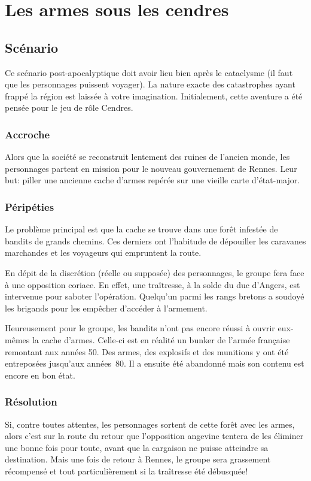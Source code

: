 \chapter{Les armes sous les cendres}

\section{Scénario}

Ce scénario post-apocalyptique doit avoir lieu bien après le cataclysme (il faut que les personnages puissent voyager).
La nature exacte des catastrophes ayant frappé la région est laissée à votre imagination.
Initialement, cette aventure a été pensée pour le jeu de rôle Cendres.

\subsection{Accroche}

Alors que la société se reconstruit lentement des ruines de l'ancien monde, les personnages partent en mission pour le nouveau gouvernement de Rennes.
Leur but: piller une ancienne cache d'armes repérée sur une vieille carte d'état-major.

\subsection{Péripéties}

Le problème principal est que la cache se trouve dans une forêt infestée de bandits de grands chemins.
Ces derniers ont l'habitude de dépouiller les caravanes marchandes et les voyageurs qui empruntent la route.

En dépit de la discrétion (réelle ou supposée) des personnages, le groupe fera face à une opposition coriace.
En effet, une traîtresse, à la solde du duc d'Angers, est intervenue pour saboter l'opération.
Quelqu'un parmi les rangs bretons a soudoyé les brigands pour les empêcher d'accéder à l'armement.

Heureusement pour le groupe, les bandits n'ont pas encore réussi à ouvrir eux-mêmes la cache d'armes.
Celle-ci est en réalité un bunker de l'armée française remontant aux années 50.
Des armes, des explosifs et des munitions y ont été entreposées jusqu'aux années 80.
Il a ensuite été abandonné mais son contenu est encore en bon état.

\subsection{Résolution}

Si, contre toutes attentes, les personnages sortent de cette forêt avec les armes, alors c'est sur la route du retour que l'opposition angevine tentera de les éliminer une bonne fois pour toute, avant que la cargaison ne puisse atteindre sa destination.
Mais une fois de retour à Rennes, le groupe sera grassement récompensé et tout particulièrement si la traîtresse été débusquée!

